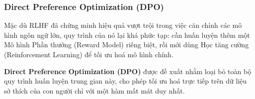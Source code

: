 \subsubsection{Direct Preference Optimization (DPO)}
\label{ssec:dpo}

Mặc dù RLHF đã chứng minh hiệu quả vượt trội trong việc căn chỉnh các mô hình ngôn ngữ lớn, quy trình của nó lại khá phức tạp: cần huấn luyện thêm một Mô hình Phần thưởng (Reward Model) riêng biệt, rồi mới dùng Học tăng cường (Reinforcement Learning) để tối ưu hoá mô hình chính. 

\textbf{Direct Preference Optimization (DPO)} \cite{rafailov2023direct} được đề xuất nhằm loại bỏ toàn bộ quy trình huấn luyện trung gian này, cho phép tối ưu hoá trực tiếp trên dữ liệu sở thích của con người chỉ với một hàm mất mát duy nhất.  

